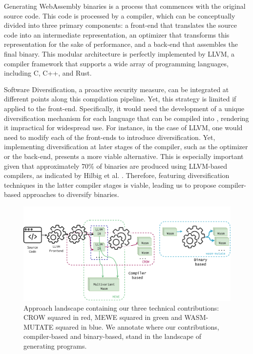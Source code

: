 

Generating  WebAssembly binaries is a process that commences with the original source code.
This code is processed by a compiler, which can be conceptually divided into three primary components: a front-end that translates the source code into an intermediate representation, an optimizer that transforms this representation for the sake of performance, and a back-end that assembles the final \Wasm binary. 
This modular architecture is perfectly implemented by LLVM, a compiler framework that supports a wide array of programming languages, including C, C++, and Rust. 

Software Diversification, a proactive security measure, can be integrated at different points along this compilation pipeline. 
Yet, this strategy is limited if applied to the front-end. 
Specifically, it would need the development of a unique diversification mechanism for each language that can be compiled into \Wasm, rendering it impractical for widespread use. 
For instance, in the case of LLVM, one would need to modify each of the front-ends to introduce diversification. 
Yet, implementing diversification at later stages of the compiler, such as the optimizer or the back-end, presents a more viable alternative. 
This is especially important given that approximately 70\% of \Wasm binaries are produced using LLVM-based compilers, as indicated by Hilbig et al. \cite{Hilbig2021AnES}.
Therefore, featuring diversification techniques in the latter compiler stages is viable, leading us to propose compiler-based approaches to diversify \Wasm binaries. 


\begin{figure}[h]
	\centering
	\includegraphics[width=1.0\textwidth]{figures/landscape.pdf}
	\caption{Approach landscape containing our three technical contributions: CROW squared in red, MEWE squared in green and WASM-MUTATE squared in blue. We annotate where our contributions, compiler-based and binary-based, stand in the landscape of generating \Wasm programs.}
	\label{fig:approach_landscape}
\end{figure}

